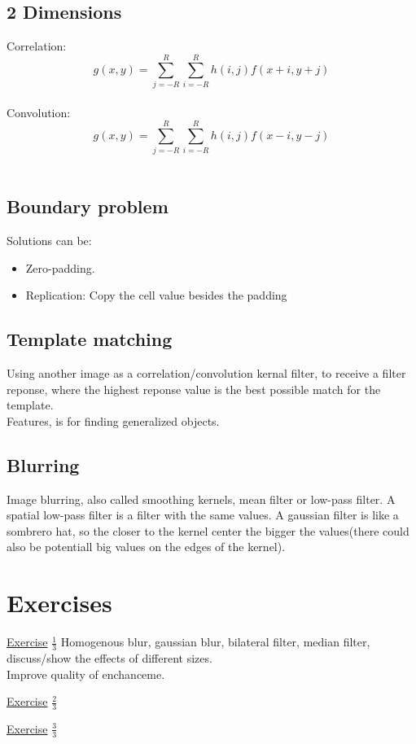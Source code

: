 \documentclass{article}
\begin{document}
\subsection{2 Dimensions}
Correlation: $$ g(x,y) = \sum_{j=-R}^{R} \sum_{i=-R}^{R} h(i,j)f(x+i, y+j) $$\\
Convolution: $$ g(x,y) = \sum_{j=-R}^{R} \sum_{i=-R}^{R} h(i,j)f(x-i, y-j) $$\\
\subsection{Boundary problem}
Solutions can be:
\begin{itemize}
  \item Zero-padding.
  \item Replication: Copy the cell value besides the padding
\end{itemize}

\subsection{Template matching}
Using another image as a correlation/convolution kernal filter, to receive a filter reponse, where the highest reponse value is the best possible match for the template.\\
Features, is for finding generalized objects.\\

\subsection{Blurring}
Image blurring, also called smoothing kernels, mean filter or low-pass filter. A spatial low-pass filter is a filter with the same values. A gaussian filter is like a sombrero hat, so the closer to the kernel center the bigger the values(there could also be potentiall big values on the edges of the kernel).\\

\section{Exercises}
\underline{Exercise} $\frac{1}{3}$
Homogenous blur, gaussian blur, bilateral filter, median filter, discuss/show the effects of different sizes.\\ Improve quality of enchanceme.

\underline{Exercise} $\frac{2}{3}$

\underline{Exercise} $\frac{3}{3}$
\end{document}
